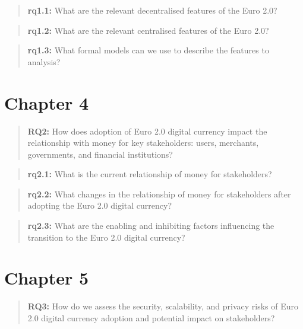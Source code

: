 \documentclass[12pt]{article} %
\begin{document}
\begin{quotation}
	\textbf{rq1.1:} What are the relevant decentralised features of the Euro 2.0?
\end{quotation}{

\begin{quotation}
	\textbf{rq1.2:} What are the relevant centralised features of the Euro 2.0?
\end{quotation}{

\begin{quotation}
	\textbf{rq1.3:} What formal models can we use to describe the features to analysis?
\end{quotation}{

\pagebreak

\section{Chapter 4}
\label{Chapter 4}


\begin{quotation}
	\textbf{RQ2:} How does adoption of Euro 2.0 digital currency impact the relationship with money for key stakeholders: users, merchants, governments, and financial institutions?
\end{quotation}

\begin{quotation}
	\textbf{rq2.1:} What is the current relationship of money for stakeholders?
\end{quotation}
\begin{quotation}
	\textbf{rq2.2:} What changes in the relationship of money for stakeholders after adopting the Euro 2.0 digital currency?
\end{quotation}
\begin{quotation}
	\textbf{rq2.3:} What are the enabling and inhibiting factors influencing the transition to the Euro 2.0 digital currency?
\end{quotation}

\pagebreak

\section{Chapter 5}
\label{Chapter 5}


\begin{quotation}
	\textbf{RQ3:} How do we assess the security, scalability, and privacy risks of Euro 2.0 digital currency adoption and potential impact on stakeholders?
\end{quotation}

}}}
\end{document}
